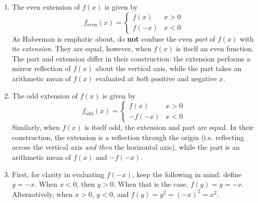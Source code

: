 \documentclass[a4paper]{article}
\begin{document}
\begin{enumerate}[label=(\alph*)]
	\item The even extension of \( f \!\left( x \right) \) is given by
	\[
		f_{\text{even}}\!\left( x \right) = \begin{cases}
			f \!\left( x \right) & x > 0 \\
			f \!\left( -x \right) & x < 0 
		\end{cases} 
	\]
	As Haberman is emphatic about, do \textbf{not} confuse the even \textit{part} of \( f \!\left( x \right) \) with its \textit{extension}. They are equal, however, when \( f \!\left( x \right) \) is itself an even function. The part and extension differ in their construction: the extension performs a mirror reflection of \( f \!\left( x \right) \) about the vertical axis, while the part takes an arithmetic mean of \( f \!\left( x \right) \) evaluated at \textit{both} positive and negative \( x \).
	\item The odd extension of \( f \!\left( x \right) \) is given by
	\[
		f_{\text{odd}}\!\left( x \right) = \begin{cases}
			f \!\left( x \right) & x > 0 \\
			-f \!\left( -x \right) & x < 0 
		\end{cases} 
	\]
	Similarly, when \( f \!\left( x \right) \) is itself odd, the extension and part are equal. In their construction, the extension is a reflection through the origin (i.e. reflecting across the vertical axis \textit{and then} the horizontal axis), while the part is an arithmetic mean of \( f \!\left( x \right) \) and \( -f \!\left( -x \right) \).
	\item First, for clarity in evaluating \( f \!\left( -x \right) \), keep the following in mind: define \( y = -x \). When \( x < 0 \), then \( y > 0 \). When that is the case, \( f \!\left( y \right) = y = -x \). Alternatively, when \( x > 0 \), \( y < 0 \), and \(  f \!\left( y \right) = y^{2} = \!\left( -x \right)^{2} = x^{2} \).


\end{enumerate}
\end{document}
